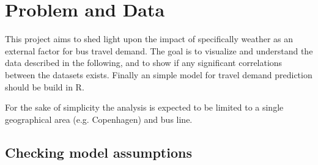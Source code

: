 \documentclass[a4paper,11pt]{article}
\begin{document}
\clearpage

\section{Problem and Data}\label{ch:data_old}
This project aims to shed light upon the impact of specifically weather as an external factor for bus travel demand. The goal is to visualize and understand the data described in the following, and to show if any significant correlations between the datasets exists. Finally an simple model for travel demand prediction should be build in R.

For the sake of simplicity the analysis is expected to be limited to a single geographical area (e.g. Copenhagen) and bus line.

\subsection{Checking model assumptions}

\begin{spacing}{1}
  
  
\end{spacing}
\end{document}
